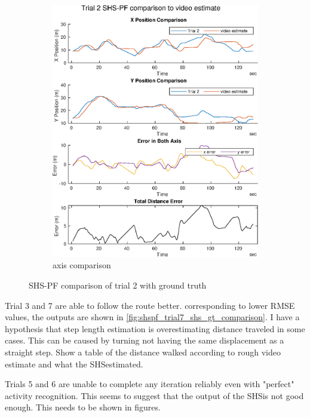 \begin{figure}[H]
\begin{subfigure}[t]{.45\textwidth}
		\includegraphics[width=\linewidth]{images/20201118_1902_trial2_output_1}
		\caption{axis comparison}
		\label{fig:shspf_trial2_comparison}
	\end{subfigure}
	\caption{SHS-PF comparison of trial 2 with ground truth}
	\label{fig:shspf_trial2_shs_gt_comparison}
\end{figure}

 Trial 3 and 7 are able to follow the route better. corresponding to lower RMSE values, the outputs are shown in \cref{fig:shspf_trial7_shs_gt_comparison}.
I have a hypothesis that step length estimation is overestimating distance traveled in some cases. This can be caused by turning not having the same displacement as a straight step.
Show a table of the distance walked according to rough video estimate and what the \ac{SHS}estimated.

Trials 5 and 6 are unable to complete any iteration reliably even with "perfect" activity recognition. This seems to suggest that the output of the \ac{SHS}is not good enough. This needs to be shown in figures.


